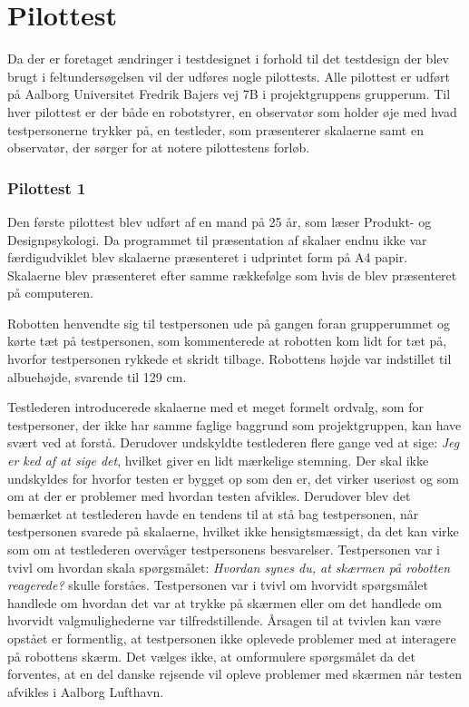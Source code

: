 \section{Pilottest}
\label{TestAfSkalaPilottest}
%
Da der er foretaget ændringer i testdesignet i forhold til det testdesign der blev brugt i feltundersøgelsen vil der udføres nogle pilottests. Alle pilottest er udført på Aalborg Universitet Fredrik Bajers vej 7B i projektgruppens grupperum. Til hver pilottest er der både en robotstyrer, en observatør som holder øje med hvad testpersonerne trykker på, en testleder, som præsenterer skalaerne samt en observatør, der sørger for at notere pilottestens forløb.  

\subsubsection*{Pilottest 1}
\label{TestAfSkalaerPilot1}
%
Den første pilottest blev udført af en mand på 25 år, som læser Produkt- og Designpsykologi. Da programmet til præsentation af skalaer endnu ikke var færdigudviklet blev skalaerne præsenteret i udprintet form på A4 papir. Skalaerne blev præsenteret efter samme rækkefølge som hvis de blev præsenteret på computeren.

Robotten henvendte sig til testpersonen ude på gangen foran grupperummet og kørte tæt på testpersonen, som kommenterede at robotten kom lidt for tæt på, hvorfor testpersonen rykkede et skridt tilbage. Robottens højde var indstillet til albuehøjde, svarende til 129 cm. 

Testlederen introducerede skalaerne med et meget formelt ordvalg, som for testpersoner, der ikke har samme faglige baggrund som projektgruppen, kan have svært ved at forstå. Derudover undskyldte testlederen flere gange ved at sige: \textit{Jeg er ked af at sige det}, hvilket giver en lidt mærkelige stemning. Der skal ikke undskyldes for hvorfor testen er bygget op som den er, det virker useriøst og som om at der er problemer med hvordan testen afvikles. Derudover blev det bemærket at testlederen havde en tendens til at stå bag testpersonen, når testpersonen svarede på skalaerne, hvilket ikke hensigtsmæssigt, da det kan virke som om at testlederen overvåger testpersonens besvarelser.\blankline
%
Testpersonen var i tvivl om hvordan skala spørgsmålet: \textit{Hvordan synes du, at skærmen på robotten reagerede?} skulle forståes. Testpersonen var i tvivl om hvorvidt spørgsmålet handlede om hvordan det var at trykke på skærmen eller om det handlede om hvorvidt valgmulighederne var tilfredstillende. Årsagen til at tvivlen kan være opstået er formentlig, at testpersonen ikke oplevede problemer med at interagere på robottens skærm. Det vælges ikke, at omformulere spørgsmålet da det forventes, at en del danske rejsende vil opleve problemer med skærmen når testen afvikles i Aalborg Lufthavn. 

